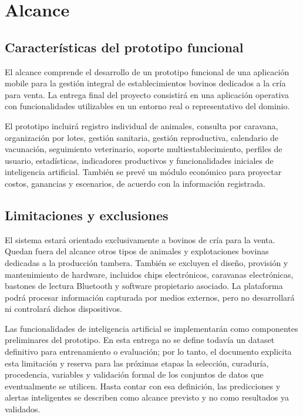 \section{Alcance}

\subsection{Caracter\'isticas del prototipo funcional}

El alcance comprende el desarrollo de un prototipo funcional de una aplicaci\'on mobile para la gesti\'on integral de establecimientos bovinos dedicados a la cr\'ia para venta. La entrega final del proyecto consistir\'a en una aplicaci\'on operativa con funcionalidades utilizables en un entorno real o representativo del dominio.

El prototipo incluir\'a registro individual de animales, consulta por caravana, organizaci\'on por lotes, gesti\'on sanitaria, gesti\'on reproductiva, calendario de vacunaci\'on, seguimiento veterinario, soporte multiestablecimiento, perfiles de usuario, estad\'isticas, indicadores productivos y funcionalidades iniciales de inteligencia artificial. Tambi\'en se prev\'e un m\'odulo econ\'omico para proyectar costos, ganancias y escenarios, de acuerdo con la informaci\'on registrada.

\subsection{Limitaciones y exclusiones}

El sistema estar\'a orientado exclusivamente a bovinos de cr\'ia para la venta. Quedan fuera del alcance otros tipos de animales y explotaciones bovinas dedicadas a la producci\'on tambera. Tambi\'en se excluyen el dise\~no, provisi\'on y mantenimiento de hardware, incluidos chips electr\'onicos, caravanas electr\'onicas, bastones de lectura Bluetooth y software propietario asociado. La plataforma podr\'a procesar informaci\'on capturada por medios externos, pero no desarrollar\'a ni controlar\'a dichos dispositivos.

Las funcionalidades de inteligencia artificial se implementar\'an como componentes preliminares del prototipo. En esta entrega no se define todav\'ia un dataset definitivo para entrenamiento o evaluaci\'on; por lo tanto, el documento explicita esta limitaci\'on y reserva para las pr\'oximas etapas la selecci\'on, curadur\'ia, procedencia, variables y validaci\'on formal de los conjuntos de datos que eventualmente se utilicen. Hasta contar con esa definici\'on, las predicciones y alertas inteligentes se describen como alcance previsto y no como resultados ya validados.

